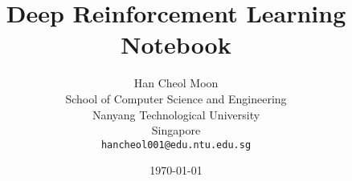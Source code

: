 \documentclass[oneside,a4paper,11pt]{book}
\begin{document}
\author{%
	Han Cheol Moon\\
	School of Computer Science and Engineering\\
	Nanyang Technological University\\
	Singapore\\
	\texttt{hancheol001@edu.ntu.edu.sg}
}
\title{Deep Reinforcement Learning Notebook}
\date{\today}

\frontmatter
\maketitle
\tableofcontents
\newpage

\mainmatter






\backmatter




\appendix

\end{document}
